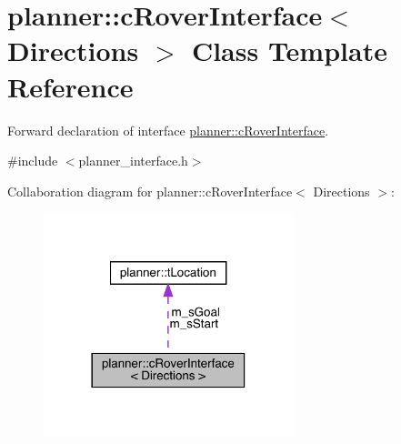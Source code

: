 \hypertarget{classplanner_1_1c_rover_interface}{}\section{planner\+:\+:c\+Rover\+Interface$<$ Directions $>$ Class Template Reference}
\label{classplanner_1_1c_rover_interface}


Forward declaration of interface \mbox{\hyperlink{classplanner_1_1c_rover_interface}{planner\+::c\+Rover\+Interface}}.  




{\ttfamily \#include $<$planner\+\_\+interface.\+h$>$}



Collaboration diagram for planner\+:\+:c\+Rover\+Interface$<$ Directions $>$\+:
\nopagebreak
\begin{figure}[H]
\begin{center}
\leavevmode
\includegraphics[width=206pt]{classplanner_1_1c_rover_interface__coll__graph}
\end{center}
\end{figure}
